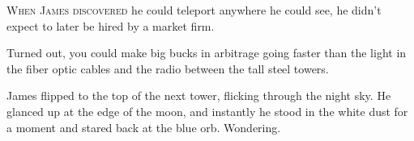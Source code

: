 
\lettrine{W}{hen James discovered} he could teleport anywhere he could see, he didn't
expect to later be hired by a market firm.

Turned out, you could make big bucks in arbitrage going faster than the
light in the fiber optic cables and the radio between the tall steel
towers.

James flipped to the top of the next tower, flicking through the night
sky. He glanced up at the edge of the moon, and instantly he stood in
the white dust for a moment and stared back at the blue orb. Wondering.
